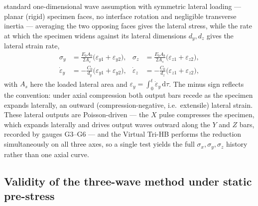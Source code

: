 \documentclass[sn-basic]{sn-jnl}
\newcommand{\Cz}{C_{0}}
\newcommand{\eps}{\varepsilon}
\newcommand{\epsd}{\dot{\varepsilon}}
\begin{document}
standard one-dimensional wave assumption with symmetric lateral loading --- planar
(rigid) specimen faces, no interface rotation and negligible transverse inertia
--- averaging the two opposing faces gives the lateral stress, while the rate at
which the specimen widens against its lateral dimensions $d_y,d_z$ gives the
lateral strain rate,
\begin{align}
\sigma_y &=\frac{E_b A_b}{2A_s}\big(\eps_{y1}+\eps_{y2}\big), &
\sigma_z &=\frac{E_b A_b}{2A_s}\big(\eps_{z1}+\eps_{z2}\big), \\
\epsd_y  &=-\frac{\Cz}{d_y}\big(\eps_{y1}+\eps_{y2}\big), &
\epsd_z  &=-\frac{\Cz}{d_z}\big(\eps_{z1}+\eps_{z2}\big),
\label{eq:lateral}
\end{align}
with $A_s$ here the loaded lateral area and $\eps_{y}=\int_0^t\epsd_y\,\mathrm{d}\tau$.
The minus sign reflects the convention: under axial compression both output bars
recede as the specimen expands laterally, an outward (compression-negative,
i.e.\ extensile) lateral strain. These lateral outputs are Poisson-driven --- the
$X$ pulse compresses the specimen, which expands laterally and drives output
waves outward along the $Y$ and $Z$ bars, recorded by gauges G3--G6 --- and the
Virtual Tri-HB performs the reduction simultaneously on all three axes, so a
single test yields the full $\sigma_x,\sigma_y,\sigma_z$ history rather than one
axial curve.

\subsection{Validity of the three-wave method under static pre-stress}\label{sec:prestress}
\end{document}
